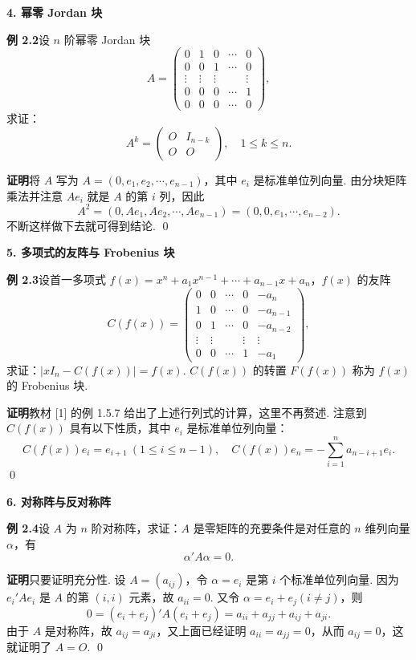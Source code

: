 \documentclass[UTF8,12pt,a4paper,fontset=fandol]{ctexart}
\begin{document}
\noindent\textbf{4. 幂零 Jordan 块}

\noindent\textbf{例 2.2}\quad 设 $n$ 阶幂零 Jordan 块
\[
A=
\left(
\begin{array}{ccccc}
0 & 1 & 0 & \cdots & 0\\
0 & 0 & 1 & \cdots & 0\\
\vdots & \vdots & \vdots & & \vdots\\
0 & 0 & 0 & \cdots & 1\\
0 & 0 & 0 & \cdots & 0
\end{array}
\right),
\]
求证：
\[
A^k=
\left(
\begin{array}{cc}
O & I_{n-k}\\
O & O
\end{array}
\right),\quad 1\le k\le n.
\]

\noindent\textbf{证明}\quad 将 $A$ 写为 $A=(0,e_1,e_2,\cdots,e_{n-1})$，其中 $e_i$ 是标准单位列向量. 由分块矩阵乘法并注意 $Ae_i$ 就是 $A$ 的第 $i$ 列，因此
\[
A^2=(0,Ae_1,Ae_2,\cdots,Ae_{n-1})=(0,0,e_1,\cdots,e_{n-2}).
\]
不断这样做下去就可得到结论. \qed

\noindent\textbf{5. 多项式的友阵与 Frobenius 块}

\noindent\textbf{例 2.3}\quad 设首一多项式 $f(x)=x^n+a_1x^{n-1}+\cdots+a_{n-1}x+a_n$，$f(x)$ 的友阵
\[
C(f(x))=
\left(
\begin{array}{ccccc}
0 & 0 & \cdots & 0 & -a_n\\
1 & 0 & \cdots & 0 & -a_{n-1}\\
0 & 1 & \cdots & 0 & -a_{n-2}\\
\vdots & \vdots & & \vdots & \vdots\\
0 & 0 & \cdots & 1 & -a_1
\end{array}
\right),
\]
求证：$|xI_n-C(f(x))|=f(x)$. $C(f(x))$ 的转置 $F(f(x))$ 称为 $f(x)$ 的 Frobenius 块.

\noindent\textbf{证明}\quad 教材 [1] 的例 1.5.7 给出了上述行列式的计算，这里不再赘述. 注意到 $C(f(x))$ 具有以下性质，其中 $e_i$ 是标准单位列向量：
\[
C(f(x))e_i=e_{i+1}\ (1\le i\le n-1),\quad
C(f(x))e_n=-\sum_{i=1}^n a_{n-i+1}e_i.
\]
\qed

\noindent\textbf{6. 对称阵与反对称阵}

\noindent\textbf{例 2.4}\quad 设 $A$ 为 $n$ 阶对称阵，求证：$A$ 是零矩阵的充要条件是对任意的 $n$ 维列向量 $\alpha$，有
\[
\alpha' A\alpha=0.
\]

\noindent\textbf{证明}\quad 只要证明充分性. 设 $A=(a_{ij})$，令 $\alpha=e_i$ 是第 $i$ 个标准单位列向量. 因为 $e_i'Ae_i$ 是 $A$ 的第 $(i,i)$ 元素，故 $a_{ii}=0$. 又令 $\alpha=e_i+e_j(i\ne j)$，则
\[
0=(e_i+e_j)'A(e_i+e_j)=a_{ii}+a_{jj}+a_{ij}+a_{ji}.
\]
由于 $A$ 是对称阵，故 $a_{ij}=a_{ji}$，又上面已经证明 $a_{ii}=a_{jj}=0$，从而 $a_{ij}=0$，这就证明了 $A=O$. \qed
\end{document}
